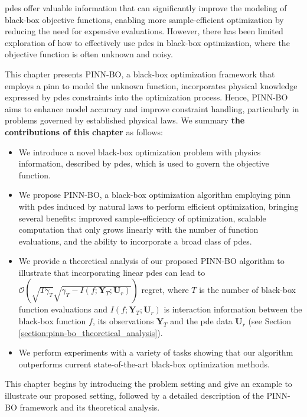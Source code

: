 \acp{pde} offer valuable information that can significantly improve the modeling of black-box objective functions, enabling more sample-efficient optimization by reducing the need for expensive evaluations. However, there has been limited exploration of how to effectively use \acp{pde} in black-box optimization, where the objective function is often unknown and noisy.


This chapter presents PINN-BO, a black-box optimization framework that employs a \ac{pinn} to model the unknown function, incorporates physical knowledge expressed by \acp{pde} constraints into the optimization process. Hence, PINN-BO aims to enhance model accuracy and improve constraint handling, particularly in problems governed by established physical laws. We summary \textbf{the contributions of this chapter} as follows:
\begin{itemize}
    \item We introduce a novel black-box optimization problem with physics information, described by \acfp{pde}, which is used to govern the objective function.
    
    \item We propose PINN-BO, a black-box optimization algorithm employing \acl{pinn} with \acfp{pde} induced by natural laws to perform efficient optimization, bringing several benefits: improved sample-efficiency of optimization, scalable computation that only grows linearly with the number of function evaluations, and the ability to incorporate a broad class of \acp{pde}.
     
    \item We provide a theoretical analysis of our proposed PINN-BO algorithm to illustrate that incorporating linear \acp{pde} can lead to $\mathcal{O}\left(\sqrt{T\gamma_T}\sqrt{\gamma_T - I (f; \mathbf{Y}_T; \mathbf{U}_r) } \right)$ regret, where $T$ is the number of black-box function evaluations and $I (f; \mathbf{Y}_T; \mathbf{U}_r)$ is interaction information between the black-box function  $f$, its observations $\mathbf{Y}_T$ and the \ac{pde} data $\mathbf{U}_r$ (see Section \ref{section:pinn-bo_theoretical_analysis}).
    \item We perform experiments with a variety of tasks showing that our algorithm outperforms current state-of-the-art black-box optimization methods.
\end{itemize} 
This chapter begins by introducing the problem setting and give an example to illustrate our proposed setting, followed by a detailed description of the PINN-BO framework and its theoretical analysis.
\label{chap:pinn-bo} %
